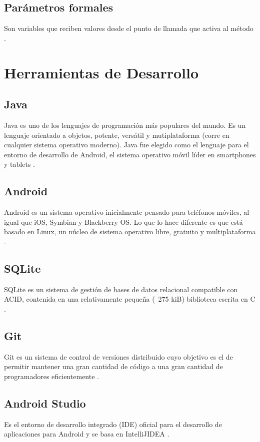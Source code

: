 \subsection{Parámetros formales}
Son variables que reciben valores desde el punto de llamada que activa al método \citep{izquierdo2007introduccion}.


\section{Herramientas de Desarrollo}
\subsection{Java}
Java es uno de los lenguajes de programación más populares del mundo. Es un lenguaje orientado a objetos, potente, versátil y mutiplataforma (corre en cualquier sistema operativo moderno). Java fue elegido como el lenguaje para el entorno de desarrollo de Android, el sistema operativo móvil líder en smartphones y tablets \citep{izquierdo2007introduccion}.

\subsection{Android}
Android es un sistema operativo inicialmente pensado para teléfonos móviles, al igual que iOS, Symbian y Blackberry OS. Lo que lo hace diferente es que está basado en Linux, un núcleo de sistema operativo libre, gratuito y multiplataforma \citep{studio2016conoce}.

\subsection{SQLite}
SQLite es un sistema de gestión de bases de datos relacional compatible con ACID, contenida en una relativamente pequeña (~275 kiB) biblioteca escrita en C \citep{owens2010sqlite}.


\subsection{Git}
Git es un sistema de control de versiones distribuido cuyo objetivo es el de permitir mantener una gran cantidad de código a una gran cantidad de programadores eficientemente \citep{alvarez2014introduccion}.

\subsection{Android Studio}
Es el entorno de desarrollo integrado (IDE) oficial para el desarrollo de aplicaciones para Android y se basa en IntelliJIDEA \citep{studio2016conoce}.
